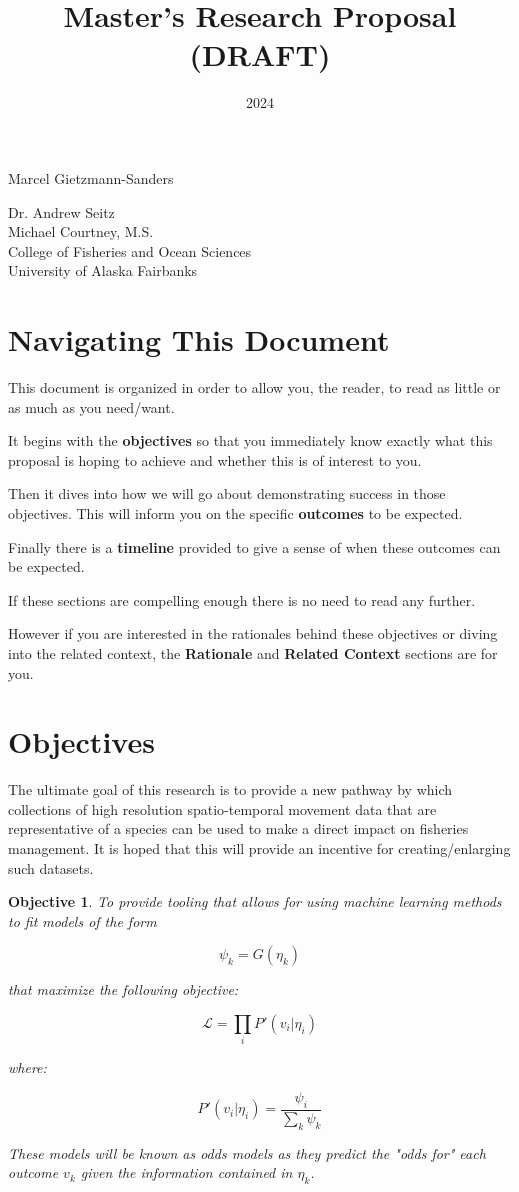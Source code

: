 \documentclass[11pt]{article}
\title{Master's Research Proposal (DRAFT)}
\date{2024}
\makeatletter
\newtheorem{objective}{Objective}
\renewcommand{\maketitle}{
\begin{center}

\pagestyle{empty}
\phantom{.}  %
\vspace{3cm}

{\Huge \bf \@title\par}
\vspace{2.5cm}

{\LARGE Marcel Gietzmann-Sanders}\\[1cm]

{\Large\@date}

\vspace{2.5cm}
{\Large Dr. Andrew Seitz}\hspace{2cm}{\Large Dr. Curry Cunningham}\\[2cm]{\Large Michael Courtney, M.S.}\\[2cm]
College of Fisheries and Ocean Sciences\\
University of Alaska Fairbanks


\end{center}
}\makeatother
\makeatother
\begin{document}
\maketitle
\newpage

\section{Navigating This Document}

This document is organized in order to allow you, the reader, to read as little or as much as you need/want. \newline

It begins with the \textbf{objectives} so that you immediately know exactly what this proposal is hoping to achieve and whether this is of interest to you.  \newline

Then it dives into how we will go about demonstrating success in those objectives. This will inform you on the specific \textbf{outcomes} to be expected. \newline

Finally there is a \textbf{timeline} provided to give a sense of when these outcomes can be expected. \newline

If these sections are compelling enough there is no need to read any further. \newline

However if you are interested in the rationales behind these objectives or diving into the related context, the \textbf{Rationale} and \textbf{Related Context} sections are for you. 

\newpage


\tableofcontents
\newpage

\section{Objectives}

The ultimate goal of this research is to provide a new pathway by which collections of high resolution spatio-temporal movement data that are representative of a species can be used to make a direct impact on fisheries management. It is hoped that this will provide an incentive for creating/enlarging such datasets. 

\begin{objective}
To provide tooling that allows for using machine learning methods to fit models of the form

$$\psi_k = G(\eta_k)$$

that maximize the following objective:


$$\mathcal{L}=\prod_i P'(v_i | \eta_i)$$

where:

$$P'(v_i|\eta_i) = \frac{\psi_i}{\sum_k \psi_k}$$

These models will be known as odds models as they predict the "odds for" each outcome $v_k$ given the information contained in $\eta_k$. 

\end{objective}
\end{document}
